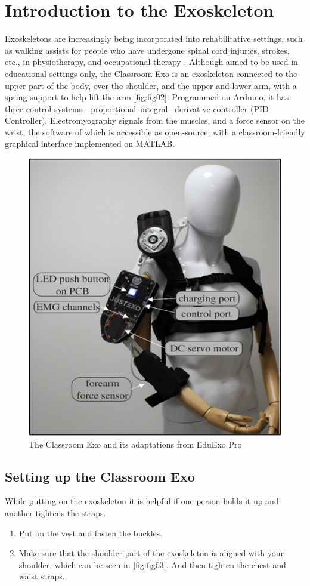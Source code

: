 \newpage
	
\section{Introduction to the Exoskeleton}
Exoskeletons are increasingly being incorporated into rehabilitative settings, such as walking assists for people who have undergone spinal cord injuries, strokes, etc., in physiotherapy, and occupational therapy \cite{Hill2017}. Although aimed to be used in educational settings only, the Classroom Exo is an exoskeleton connected to the upper part of the body, over the shoulder, and the upper and lower arm, with a spring support to help lift the arm \autoref{fig:fig02}. Programmed on Arduino, it has three control systems - proportional–integral–-derivative controller (PID Controller), Electromyography signals from the muscles, and a force sensor on the wrist, the software of which is accessible as open-source, with a classroom-friendly graphical interface implemented on MATLAB. 

\begin{figure}[H]
	\centering
	\includegraphics[width=0.7\linewidth]{img/fig_02}
	\caption{The Classroom Exo and its adaptations from EduExo Pro }
	\label{fig:fig02}
\end{figure}

\subsection{Setting up the Classroom Exo}
While putting on the exoskeleton it is helpful if one person holds it up and another tightens the straps.
\begin{enumerate}[]
	\item Put on the vest and fasten the buckles. 
	\item Make sure that the shoulder part of the exoskeleton is aligned with your shoulder, which can be seen in \autoref{fig:fig03}. And then tighten the chest and waist straps.
\end{enumerate}

